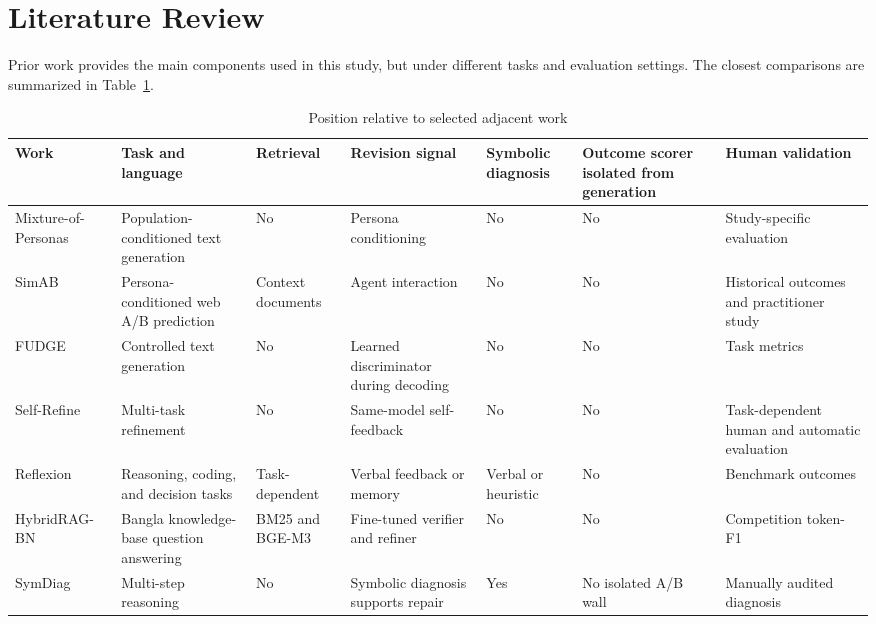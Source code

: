 \section{Literature Review}
\label{sec:literature-review}

Prior work provides the main components used in this study, but under different tasks and evaluation settings. The closest comparisons are summarized in Table~\ref{tab:literature-review}.

\begin{table}[t]
\centering
\caption{Position relative to selected adjacent work}
\label{tab:literature-review}
\scriptsize
\setlength{\tabcolsep}{2.4pt}
\renewcommand{\arraystretch}{1.06}
\begin{tabularx}{\textwidth}{@{}
  >{\raggedright\arraybackslash}p{}
  >{\raggedright\arraybackslash}p{}
  >{\raggedright\arraybackslash}p{}
  >{\raggedright\arraybackslash}p{}
  >{\raggedright\arraybackslash}p{}
  >{\raggedright\arraybackslash}p{}
  >{\raggedright\arraybackslash}X@{}}
\toprule
\textbf{Work} & \textbf{Task and language} & \textbf{Retrieval} & \textbf{Revision signal} & \textbf{Symbolic diagnosis} & \textbf{Outcome scorer isolated from generation} & \textbf{Human validation} \\
\midrule
Mixture-of-Personas~\cite{b9} & Population-conditioned text generation & No & Persona conditioning & No & No & Study-specific evaluation \\
SimAB~\cite{b10} & Persona-conditioned web A/B prediction & Context documents & Agent interaction & No & No & Historical outcomes and practitioner study \\
FUDGE~\cite{b11} & Controlled text generation & No & Learned discriminator during decoding & No & No & Task metrics \\
Self-Refine~\cite{b13} & Multi-task refinement & No & Same-model self-feedback & No & No & Task-dependent human and automatic evaluation \\
Reflexion~\cite{b14} & Reasoning, coding, and decision tasks & Task-dependent & Verbal feedback or memory & Verbal or heuristic & No & Benchmark outcomes \\
HybridRAG-BN~\cite{b19} & Bangla knowledge-base question answering & BM25 and BGE-M3 & Fine-tuned verifier and refiner & No & No & Competition token-F1 \\
SymDiag~\cite{b20} & Multi-step reasoning & No & Symbolic diagnosis supports repair & Yes & No isolated A/B wall & Manually audited diagnosis \\

\end{tabularx}
\end{table}
